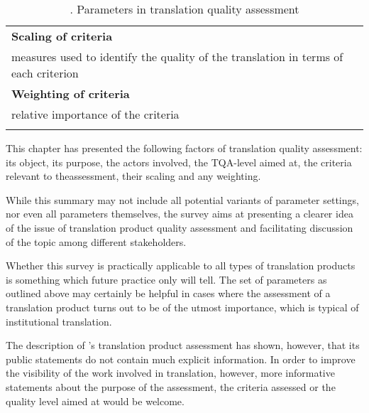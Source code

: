 \documentclass[output=paper]{langsci/langscibook}
\begin{document}
\begin{table}
\begin{tabularx}{\textwidth}{Q}
 
 \tablevspace 
{\textbf{Scaling of criteria}}  \\
 measures used to identify the quality of the translation in terms of each criterion  \\
{\textbf{Weighting of criteria}}  \\
 relative importance of the criteria  \\
\lspbottomrule
\end{tabularx}
\caption{\label{tab:vandepitte:1}. Parameters in translation quality assessment}
\end{table}

This chapter has presented the following factors of translation quality assessment: its object, its purpose, the actors involved, the TQA-level aimed at, the criteria relevant to theassessment, their scaling and any weighting. 

While this summary may not include all potential variants of parameter settings, nor even all parameters themselves, the survey aims at presenting a clearer idea of the issue of translation product quality assessment and facilitating discussion of the topic among different stakeholders. 

Whether this survey is practically applicable to all types of translation products is something which future practice only will tell. The set of parameters as outlined above may certainly be helpful in cases where the assessment of a translation product turns out to be of the utmost importance, which is typical of institutional translation. 

The description of \citeauthor{SCTA2015}'s translation product assessment has shown, however, that its public statements do not contain much explicit information. In order to improve the visibility of the work involved in translation, however, more informative statements about the purpose of the assessment, the criteria assessed or the quality level aimed at would be welcome. 

\clearpage 
\sloppy
\printbibliography[heading=subbibliography,notkeyword=this] 
\end{document}
